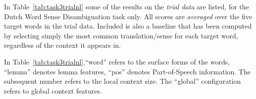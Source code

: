 
In Table~\ref{tab:task3trialnl} some of the results on the \emph{trial data}
are listed, for the Dutch Word Sense Disambiguation task only.  All scores are
\emph{averaged} over the five target words in the trial data. Included is also
a baseline that has been computed by selecting simply the most common
translation/sense for each target word, regardless of the context it appears
in.

\begin{table}
\footnotesize{
\noindent{}
\caption{Average scores for various configurations on the trial data of the English-\emph{Dutch} Word Sense Disambiguation
    task, averaged over five target words. At the time this experiment was conducted, a bug existed in the output format specification, resulting in slightly lower scores.}
\label{tab:task3trialnl}
}
\end{table}

In Table~\ref{tab:task3trialnl},``word'' refers to the surface forms of the
words, ``lemma'' denotes lemma features, ``pos'' denotes Part-of-Speech
information. The subsequent number refers to the local context size. The
``global'' configuration refers to global context features.

